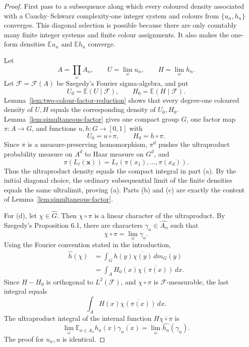 \documentclass[11pt]{article}
\numberwithin{equation}{section}
\newcommand{\E}{\mathbb E}
\newcommand{\1}{\mathbf 1}
\newcommand{\calF}{\mathcal F}
\begin{document}
\begin{proof}
First pass to a subsequence along which every coloured density associated
with a Cauchy--Schwarz complexity-one integer system and colours from
\(\{u_n,h_n\}\) converges.  This diagonal selection is possible because
there are only countably many finite integer systems and finite colour
assignments.  It also makes the one-form densities \(\E u_n\) and
\(\E h_n\) converge.

Let
\[
        A=\prod_\omega A_n,
        \qquad
        U=\lim_\omega u_n,
        \qquad
        H=\lim_\omega h_n.
\]
Let \(\calF=\calF(A)\) be Szegedy's Fourier sigma-algebra, and put
\[
        U_0=\E(U\mid\calF),
        \qquad
        H_0=\E(H\mid\calF).
\]
Lemma~\ref{lem:two-colour-factor-reduction} shows that every degree-one
coloured density of \(U,H\) equals the corresponding density of
\(U_0,H_0\).  Lemma~\ref{lem:simultaneous-factor} gives one compact group
\(G\), one factor map \(\pi:A\to G\), and functions \(u,h:G\to[0,1]\) with
\[
        U_0=u\circ\pi,
        \qquad
        H_0=h\circ\pi.
\]
Since \(\pi\) is a measure-preserving homomorphism, \(\pi^d\) pushes the
ultraproduct probability measure on \(A^d\) to Haar measure on \(G^d\),
and
\[
        \pi(L_\ell(\mathbf x))
        =
        L_\ell(\pi(x_1),\ldots,\pi(x_d)).
\]
Thus the ultraproduct density equals the compact integral in part (a).
By the initial diagonal choice, the ordinary subsequential limit of the
finite densities equals the same ultralimit, proving (a).  Parts (b) and
(c) are exactly the content of Lemma~\ref{lem:simultaneous-factor}.

For (d), let \(\chi\in\widehat G\).  Then \(\chi\circ\pi\) is a linear
character of the ultraproduct.  By Szegedy's Proposition 6.1, there are
characters \(\gamma_n\in\widehat{A_n}\) such that
\[
        \chi\circ\pi=\lim_\omega \gamma_n.
\]
Using the Fourier convention stated in the introduction,
\[
\begin{aligned}
        \widehat h(\chi)
        &=\int_G h(y)\overline{\chi(y)}\,dm_G(y) \\
        &=\int_A H_0(x)\overline{\chi(\pi(x))}\,dx.
\end{aligned}
\]
Since \(H-H_0\) is orthogonal to \(L^2(\calF)\), and
\(\chi\circ\pi\) is \(\calF\)-measurable, the last integral equals
\[
        \int_A H(x)\overline{\chi(\pi(x))}\,dx.
\]
The ultraproduct integral of the internal function \(H\overline{\chi\circ\pi}\)
is
\[
        \lim_\omega \E_{x\in A_n}h_n(x)\overline{\gamma_n(x)}
        =
        \lim_\omega \widehat{h_n}(\gamma_n).
\]
The proof for \(u_n,u\) is identical.
\end{proof}
\end{document}
